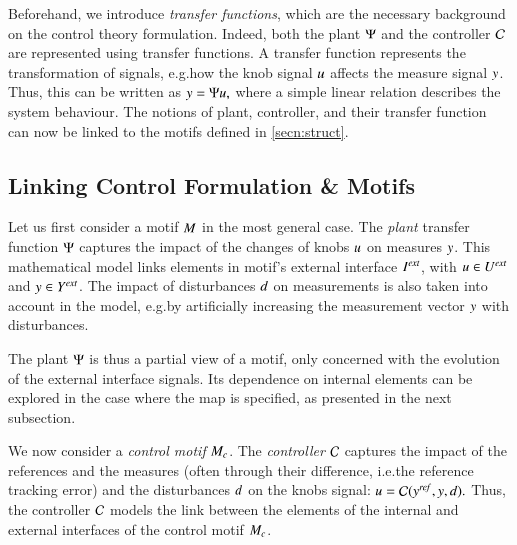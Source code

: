 \documentclass[runningheads]{llncs}
\makeatletter
\newcommand{\eg}[1][\@ ]{e.g.{#1}}
\newcommand{\ie}[1][\@ ]{i.e.{#1}}
\newcommand{\motif}[1][]{M\ifx#1\relax\else^{#1}\fi}
\newcommand{\interface}[1][]{I\ifx#1\relax\else^{#1}\fi}
\newcommand{\measure}[1][]{y\ifx#1\relax\else^{#1}\fi}
\newcommand{\measurerange}[1][]{Y\ifx#1\relax\else^{#1}\fi}
\newcommand{\knob}[1][]{u\ifx#1\relax\else^{#1}\fi}
\newcommand{\knobrange}[1][]{U\ifx#1\relax\else^{#1}\fi}
\newcommand{\disturbance}[1][]{d\ifx#1\relax\else^{#1}\fi}
\newcommand{\plant}[1][]{\Psi\ifx#1\relax\else^{#1}\fi}
\newcommand{\controller}[1][]{\mathcal{C}\ifx#1\relax\else^{#1}\fi}
\newcommand{\control}[1][]{c\ifx#1\relax\else^{#1}\fi}
\newcommand{\external}[2][]{\ifx\relax#2\relax#1\mathit{ext}\else#2[#1\mathit{ext}]\fi}
\newcommand{\setpoint}[2][]{#2[{%
      \ifthenelse{\equal{#1}{}}{}{#1,}%
      \mathit{ref}%
  }]%
}
\makeatother
\begin{document}
Beforehand, we introduce {\em transfer functions}, which are the necessary background on the control theory formulation. 
Indeed, both the plant $\plant$ and the controller $\controller$ are represented using transfer functions. A transfer function represents the transformation of signals, \eg how the knob signal $\knob$ affects the measure signal $\measure$. Thus, this can be written as
\(
\measure = \plant \knob,
\)
where a simple linear relation describes the system behaviour. 
The notions of plant, controller, and their transfer function can now be linked to the motifs defined in \cref{secn:struct}.

\subsection{Linking Control Formulation \& Motifs}
\label{secn:control-problem}

Let us first consider a motif $\motif$ in the most general case. 
The \emph{plant} transfer function $\plant$ captures the impact of the changes of knobs $\knob$ on measures $\measure$. This mathematical model links elements in motif's external interface $\external{\interface}$, with $\knob \in \external{\knobrange}$ and $\measure \in \external{\measurerange}$.
The impact of disturbances $\disturbance$ on measurements is also taken into account in the model, \eg by artificially increasing the measurement vector $\measure$ with disturbances. 

The plant $\plant$ is thus a partial view of a motif, only concerned with the evolution of the external interface signals. Its dependence on internal elements can be explored in the case where the map is specified, as presented in the next subsection.

We now consider a \emph{control motif} $\motif_{\control}$. 
The \emph{controller} $\controller$ captures the impact of the references and the measures (often through their difference, \ie the reference tracking error) and the disturbances $\disturbance$ on the knobs signal:
$
\knob = \controller (\setpoint{\measure},\measure, \disturbance).
$
Thus, the controller $\controller$ models the link between the elements of the internal and external interfaces of the control motif $\motif_{\control}$. 
\end{document}

